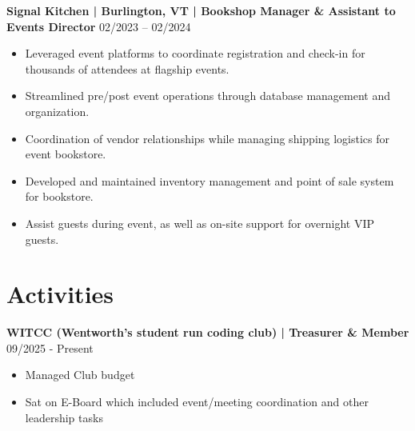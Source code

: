 \documentclass[10pt,letterpaper]{article}
\begin{document}
\vspace{4pt}
\noindent
\textbf{Signal Kitchen | Burlington, VT | Bookshop Manager \& Assistant to Events Director} \hfill 02/2023 -- 02/2024
\begin{itemize}
    \item Leveraged event platforms to coordinate registration and check-in for thousands of attendees at flagship events.
    \item Streamlined pre/post event operations through database management and organization.
    \item Coordination of vendor relationships while managing shipping logistics for event bookstore.
    \item Developed and maintained inventory management and point of sale system for bookstore.
    \item Assist guests during event, as well as on-site support for overnight VIP guests.
\end{itemize}



\section{Activities}
\noindent
\textbf{WITCC (Wentworth's student run coding club) | Treasurer \& Member} \hfill 09/2025 - Present
\begin{itemize}
    \item Managed Club budget
    \item Sat on E-Board which included event/meeting coordination and other leadership tasks
\end{itemize}
\end{document}
